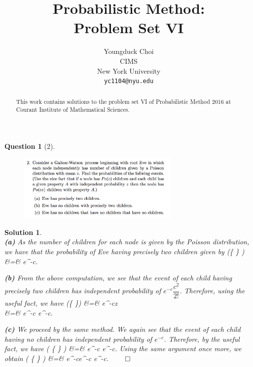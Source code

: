 \documentclass{article} %
\title{Probabilistic Method: \\
Problem Set VI}
\author{
Youngduck Choi \\
CIMS \\
New York University\\
\texttt{yc1104@nyu.edu} \\
}
\def\eQb#1\eQe{\begin{eqnarray*}#1\end{eqnarray*}}
\theoremstyle{quest}
\newtheorem*{question}{Question}
\newtheorem*{solution}{Solution}
\begin{document}
\maketitle

\begin{abstract}
This work contains solutions to the problem set VI
of Probabilistic Method 2016 at Courant Institute of Mathematical Sciences.
\end{abstract}

\bigskip

\begin{question}[2]
\hfill
\begin{figure}[h!]
  \centering
    \includegraphics[width=0.7\textwidth]{pm-6-1.png}
\end{figure}
\end{question}
\begin{solution} \hfill \\
\textbf{(a)} As the number of children for each node is given by the Poisson distribution,
we have that the probability of Eve having precisely two children given by
\eQb
P(\{  \} ) &=& e^{-c}.
\eQe

\bigskip

\textbf{(b)} From the above computation, we see
that the event of each child having precisely two children has independent 
probability of 
$e^{-c}\dfrac{c^2}{2!}$. Therefore, using the useful fact, we have 
\eQb
P(\{ 
\}) &=& e^{-cz} \\
&=& e^{-c e^{-c}}.
\eQe 

\bigskip

\textbf{(c)}
We proceed by the same method. We again see that the event of each child 
having no children has independent probability of $e^{-c}$. Therefore,
by the useful fact, we have
\eQb
P( \{  \} ) &=& e^{-c e^{-c}}.  
\eQe
Using the same argument once more, we obtain
\eQb
P( \{  \} ) &=& e^{-ce^{-c e^{-c}}}.  
\eQe
\hfill $\qed$
\end{solution}
\end{document}
